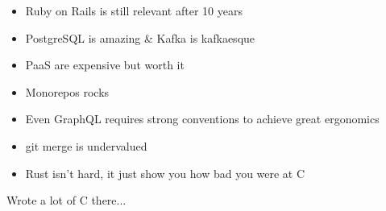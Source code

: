 \documentclass[10pt,a4paper,ragged2e,withhyper]{altacv}
\begin{document}
\begin{paracol}{2}
  \begin{itemize}
    \item Ruby on Rails is still relevant after 10 years
    \item PostgreSQL is amazing \& Kafka is kafkaesque
    \item PaaS are expensive but worth it
    \item Monorepos rocks
    \item Even GraphQL requires strong conventions to achieve great ergonomics
    \item git merge is undervalued
    \item Rust isn't hard, it just show you how bad you were at C
  \end{itemize}


  Wrote a lot of C there...

  \divider


  \newpage



  \divider


\end{paracol}
\end{document}
